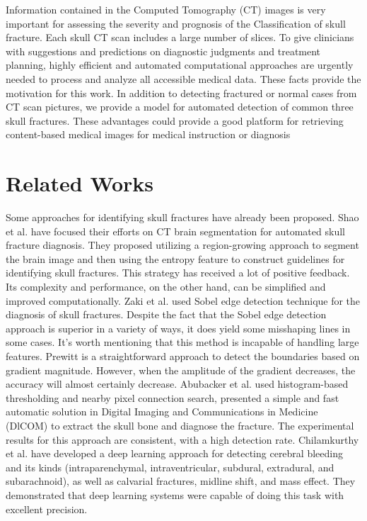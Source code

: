 \documentclass[sigconf]{acmart}
\begin{document}
Information contained in the  Computed  Tomography  (CT)  images is very important for assessing the severity and prognosis of the Classification of skull fracture. Each skull CT scan includes a large number of slices. 
To give clinicians with suggestions and predictions on diagnostic judgments and treatment planning, highly efficient and automated computational approaches are urgently needed to process and analyze all accessible medical data.
These facts provide the motivation for this work.
In addition to detecting fractured or normal cases from CT scan pictures, we provide a model for automated detection of common three skull fractures. These advantages could provide a good platform for retrieving content-based medical images for medical instruction or diagnosis
\section{Related Works}
Some approaches for identifying skull fractures have already been proposed.  Shao et al.\cite{shao2003automatic} have focused their efforts on CT brain segmentation for automated skull fracture diagnosis. They proposed utilizing a region-growing approach to segment the brain image and then using the entropy feature to construct guidelines for identifying skull fractures. This strategy has received a lot of positive feedback. Its complexity and performance, on the other hand, can be simplified and improved computationally. Zaki et al.\cite{za20ki09new} used Sobel edge detection technique for the diagnosis of skull fractures.
Despite the fact that the Sobel edge detection approach is superior in a variety of ways, it does yield some misshaping lines in some cases. It's worth mentioning that this method is incapable of handling large features. Prewitt is a straightforward approach to detect the boundaries based on gradient magnitude. However, when the amplitude of the gradient decreases, the accuracy will almost certainly decrease. Abubacker et al.\cite{abubacker2013approach} used histogram-based thresholding and nearby pixel connection search, presented a simple and fast automatic solution in Digital Imaging and Communications in Medicine (DlCOM) to extract the skull bone and diagnose the fracture. The experimental results for this approach are consistent, with a high detection rate. Chilamkurthy et al.\cite{chilamkurthy2018deep} have developed a deep learning approach for detecting cerebral bleeding and its kinds (intraparenchymal, intraventricular, subdural, extradural, and subarachnoid), as well as calvarial fractures, midline shift, and mass effect. They demonstrated that deep learning systems were capable of doing this task with excellent precision. 
\end{document}
